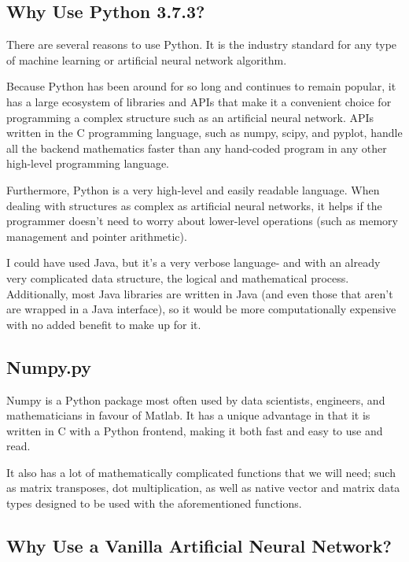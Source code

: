 \documentclass[12pt]{article}
\begin{document}

\subsection{Why Use Python 3.7.3?}

There are several reasons to use Python. It is the industry standard for any type of machine learning or artificial neural network algorithm.

Because Python has been around for so long and continues to remain popular, it has a large ecosystem of libraries and APIs that make it a convenient choice for programming a complex structure such as an artificial neural network. APIs written in the C programming language, such as numpy, scipy, and pyplot, handle all the backend mathematics faster than any hand-coded program in any other high-level programming language.

Furthermore, Python is a very high-level and easily readable language. When dealing with structures as complex as artificial neural networks, it helps if the programmer doesn't need to worry about lower-level operations (such as memory management and pointer arithmetic).

I could have used Java, but it's a very verbose language- and with an already very complicated data structure, the logical and mathematical process. Additionally, most Java libraries are written in Java (and even those that aren't are wrapped in a Java interface), so it would be more computationally expensive with no added benefit to make up for it.

\subsection{Numpy.py}

Numpy is a Python package most often used by data scientists, engineers, and mathematicians in favour of Matlab. It has a unique advantage in that it is written in C with a Python frontend, making it both fast and easy to use and read.

It also has a lot of mathematically complicated functions that we will need; such as matrix transposes, dot multiplication, as well as native vector and matrix data types designed to be used with the aforementioned functions.

\subsection{Why Use a Vanilla Artificial Neural Network?}
\end{document}
